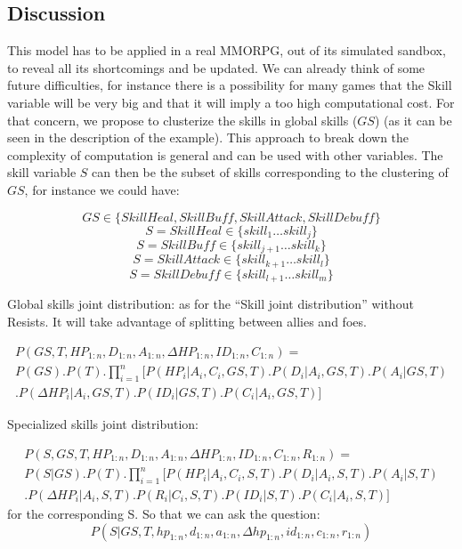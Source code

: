 \subsection{Discussion}

This model has to be applied in a real MMORPG, out of its simulated sandbox, to reveal all its shortcomings and be updated. We can already think of some future difficulties, for instance there is a possibility for many games that the Skill variable will be very big and that it will imply a too high computational cost. For that concern, we propose to clusterize the skills in global skills ($GS$) (as it can be seen in the description of the example). This approach to break down the complexity of computation is general and can be used with other variables. The skill variable $S$ can then be the subset of skills corresponding to the clustering of $GS$, for instance we could have:

$$GS \in \{SkillHeal, SkillBuff, SkillAttack, SkillDebuff\}$$
$$S = SkillHeal \in \{skill_1 \dots skill_j\}$$
$$S = SkillBuff \in \{skill_{j+1} \dots skill_k\}$$
$$S = SkillAttack \in \{skill_{k+1} \dots skill_l\}$$
$$S = SkillDebuff \in \{skill_{l+1} \dots skill_m\}$$

Global skills joint distribution: as for the “Skill joint distribution” without Resists. It will take advantage of splitting between allies and foes.

\begin{eqnarray*}
P(GS,T,HP_{1:n},D_{1:n},A_{1:n},\Delta HP_{1:n}, ID_{1:n}, C_{1:n}) = \\
P(GS).P(T).\prod_{i=1}^n [ P(HP_i | A_i, C_i, GS, T).P(D_i | A_i, GS, T).P(A_i | GS, T)\\
                        .P(\Delta HP_i | A_i, GS, T).P(ID_i | GS, T).P(C_i | A_i, GS, T)]
\end{eqnarray*}

Specialized skills joint distribution:

\begin{eqnarray*}
P(S,GS,T,HP_{1:n},D_{1:n},A_{1:n},\Delta HP_{1:n}, ID_{1:n}, C_{1:n}, R_{1:n}) = \\
P(S|GS).P(T).\prod_{i=1}^n [ P(HP_i | A_i, C_i, S, T).P(D_i | A_i, S, T).P(A_i | S, T)\\
                        .P(\Delta HP_i | A_i, S, T).P(R_i | C_i, S, T).P(ID_i | S, T).P(C_i | A_i, S, T)]
\end{eqnarray*}
for the corresponding S. So that we can ask the question:
$$P(S | GS, T, hp_{1:n}, d_{1:n}, a_{1:n}, \Delta hp_{1:n}, id_{1:n}, c_{1:n}, r_{1:n})$$

